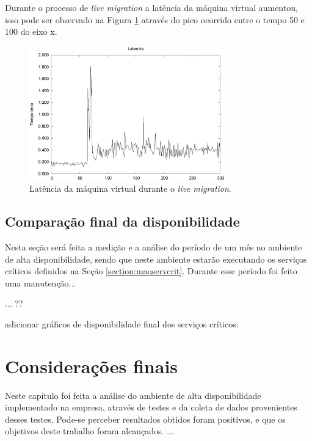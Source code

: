Durante o processo de \textit{live migration} a latência da máquina virtual aumentou, isso pode ser observado na Figura 
\ref{fig:teste2_latencia} através do pico ocorrido entre o tempo 50 e 100 do eixo x.
\begin{figure}[h!]
 \centering
 \includegraphics[width=320px]{img/teste2_latencia.eps}
 \caption{Latência da máquina virtual durante o \textit{live migration}.}
 \label{fig:teste2_latencia}
\end{figure}



\subsection{Comparação final da disponibilidade}
\label{section:comparacaofinal}

Nesta seção será feita a medição e a análise do período de um mês no ambiente de alta disponibilidade, sendo que neste ambiente estarão executando 
os serviços críticos definidos na Seção \ref{section:maqservcrit}.
Durante esse período foi feito uma manutenção...

... ??

adicionar gráficos de disponibilidade final dos serviços críticos:



\section{Considerações finais}

Neste capítulo foi feita a análise do ambiente de alta disponibilidade implementado na empresa, através de testes e da coleta de dados
provenientes desses testes. Pode-se perceber resultados obtidos foram positivos, e que os objetivos deste trabalho foram alcançados. 
...
